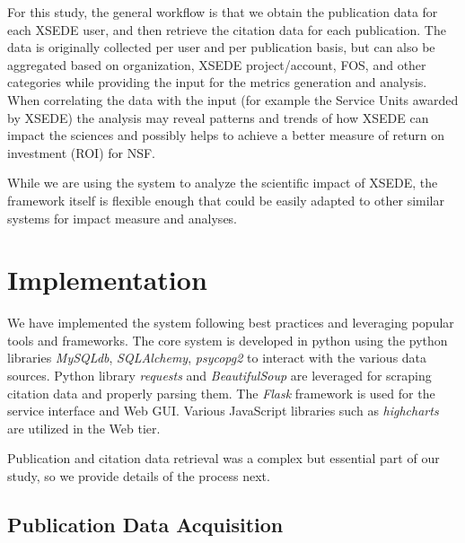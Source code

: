 \documentclass{tex/sig-alternate}
\begin{document}
For this study, the general workflow is that we obtain the publication data for each XSEDE user, and then retrieve the citation data for each publication. The data is originally collected per user and per publication basis, but can also be aggregated based on organization, XSEDE project/account, FOS, and other categories while providing the input for the metrics generation and analysis. When correlating the data with the input (for example the Service Units awarded by XSEDE) the analysis may reveal patterns and trends of how XSEDE can impact the sciences and possibly helps to achieve a better measure of return on investment (ROI) for NSF. 
 
While we are using the system to analyze the scientific impact of XSEDE, the framework itself is flexible enough that could be easily adapted to other similar systems for impact measure and analyses. 
 
 
\section{Implementation} \label{S:implementation}
 
We have implemented the system following best practices and leveraging popular tools and frameworks. The core system is developed in python using the  python libraries \emph{MySQLdb}, \emph{SQLAlchemy}, \emph{psycopg2} to interact with the various data sources. Python library \emph{requests} and \emph{BeautifulSoup} are leveraged for scraping citation data and properly parsing them. The \emph{Flask} framework is used for the service interface and Web GUI. Various JavaScript libraries such as \emph{highcharts} are utilized in the Web tier. 
 
Publication and citation data retrieval was a complex but essential part of our study, so we provide details of the process next. 
  
\subsection{Publication Data Acquisition} 
 
\end{document}
